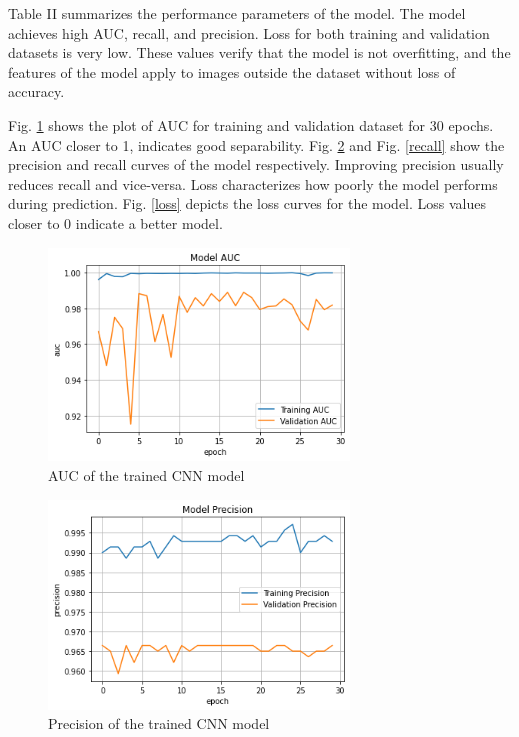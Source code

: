 \documentclass[conference]{IEEEtran}
\begin{document}
Table II summarizes the performance parameters of the model. The model achieves high AUC, recall, and precision. Loss for both training and validation datasets is very low. These values verify that the model is not overfitting, and the features of the model apply to images outside the dataset without loss of accuracy. 

\begin{table}[htpb]
\caption{\label{tab:res}Performance metrics of the developed model}
\centering
{}
\end{table}

Fig. \ref{auc} shows the plot of AUC for training and validation dataset for 30 epochs. An AUC closer to 1, indicates good separability. Fig. \ref{precision} and Fig. \ref{recall} show the precision and recall curves of the model respectively. Improving precision usually reduces recall and vice-versa. Loss characterizes how poorly the model performs during prediction. Fig. \ref{loss} depicts the loss curves for the model. Loss values closer to 0 indicate a better model.

\begin{figure}[htpb]
\centerline{\includegraphics[width=8cm]{auc.png}}
\caption{AUC of the trained CNN model}
\label{auc}
\end{figure}

\begin{figure}[htpb]
\centerline{\includegraphics[width=8cm]{precision.png}}
\caption{Precision of the trained CNN model}
\label{precision}
\end{figure}
\end{document}

